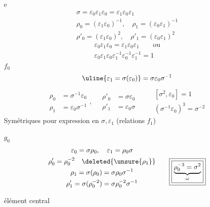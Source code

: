 \textcircled{\textcircled{e}}
\[
\begin{gathered}
\sigma=\varepsilon_0\varepsilon_1\varepsilon_0=\varepsilon_1\varepsilon_0\varepsilon_1\\
\rho_0=(\varepsilon_1\varepsilon_0)^{-1},\quad\rho_1=(\varepsilon_0\varepsilon_1)^{-1}\\
\rho'_0=(\varepsilon_1\varepsilon_0)^2,\quad\rho'_1=(\varepsilon_0\varepsilon_1)^2
\end{gathered}
\]
\[
\boxed{\boxed{\begin{gathered}
\varepsilon_0\varepsilon_1\varepsilon_0=\varepsilon_1\varepsilon_0\varepsilon_1\qquad\text{ou}\\
\varepsilon_0\varepsilon_1\varepsilon_0\varepsilon_1^{-1}\varepsilon_0^{-1}\varepsilon_1^{-1}=1
\end{gathered}}}
\]
\textcircled{$f_0$}
\[
\uline{\varepsilon_1=\sigma(\varepsilon_0)}=\sigma\varepsilon_0\sigma^{-1}
\]
\[
\boxed{\begin{aligned}\rho_0&=\sigma^{-1}\varepsilon_0\\\rho_1&=\varepsilon_0\sigma^{-1}\end{aligned}},\quad
\begin{aligned}\rho'_0&=\sigma\varepsilon_0\\\rho'_1&=\varepsilon_0\sigma\end{aligned}
\qquad
\boxed{\begin{gathered}[\sigma^2,\varepsilon_0]=1\\(\sigma^{-1}\varepsilon_0)^3=\sigma^{-2}\end{gathered}}
\]
Symétriques pour expression en $\sigma,\varepsilon_1$ (relations $f_1$)

\textcircled{\textcircled{$g_0$}}
\[
\begin{gathered}
\varepsilon_0=\sigma\rho_0,\quad\varepsilon_1=\rho_0\sigma\\
\rho'_0=\rho_0^{-2}\quad\deleted{\unsure{\rho_1}}\\
\rho_1=\sigma(\rho_0)=\sigma\rho_0\sigma^{-1}\\
\rho'_1=\sigma(\rho_0^{-2})=\sigma\rho_0^{-2}\sigma^{-1}
\end{gathered}
\qquad\boxed{\boxed{\underbrace{\rho_0^{-3}=\sigma^2}_{\omega}}}
\]
\par
élément  central

